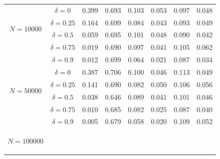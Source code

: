 \documentclass[11pt, fleqn]{article}
\begin{document}
\begin{table}
\begin{tabular}{|cc|cc|cc|cc|}
		\hline
		
		
		\multirow{4}{*}{\begin{sideways}\parbox{2cm}{\centering $N=10000$}\end{sideways}}
		
		
		
		&\hspace{-0.6cm}$\delta=0$        & 0.399&0.693   &0.103  &0.053 &0.097&0.048       \\  [0.18cm]
		&\hspace{-0.3cm}$\delta=0.25$     & 0.164&0.699   &0.084  &0.043 &0.093&0.049      \\ [0.18cm]
		&\hspace{-0.35cm}$\delta=0.5$     & 0.059&0.695   &0.101  &0.048 &0.090&0.042       \\  [0.18cm]
		&\hspace{-0.20cm}$\delta=0.75$    & 0.019&0.690   &0.097  &0.041 &0.105&0.062        \\ [0.18cm]
		&\hspace{-0.4cm}$\delta=0.9$      & 0.012&0.699   &0.064  &0.021 &0.087&0.034        \\ [0.18cm]
		
		\hline
		
		
		\multirow{4}{*}{\begin{sideways}\parbox{2cm}{\centering $N=50000$}\end{sideways}}
		
		
		
		&\hspace{-0.6cm}$\delta=0$       & 0.387&0.706   &0.100  &0.046 &0.113&0.049      \\  [0.18cm]
		&\hspace{-0.3cm}$\delta=0.25$    & 0.141&0.690   &0.082  &0.050 &0.106&0.056      \\ [0.18cm]
		&\hspace{-0.35cm}$\delta=0.5$    & 0.038&0.646   &0.089  &0.041 &0.101&0.046       \\  [0.18cm]
		&\hspace{-0.20cm}$\delta=0.75$   & 0.010&0.685   &0.082  &0.025 &0.087&0.040        \\ [0.18cm]
		&\hspace{-0.4cm}$\delta=0.9$     & 0.005&0.679   &0.058  &0.020 &0.109&0.052        \\ [0.18cm]
		\hline
		
		
		\multirow{4}{*}{\begin{sideways}\parbox{2cm}{\centering $N=100000$}\end{sideways}}
		

\end{tabular}
\end{table}
\end{document}
